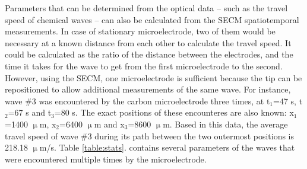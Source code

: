 \documentclass[3p, twocolumn]{elsarticle}
\begin{document}
Parameters that can be determined from the optical data -- such as the travel speed of chemical waves -- can also be calculated from the SECM spatiotemporal measurements.
In case of stationary microelectrode, two of them would be necessary at a known distance from each other to calculate the travel speed.
It could be calculated as the ratio of the distance between the electrodes, and the time it takes for the wave to get from the first microelectrode to the second.
However, using the SECM, one microelectrode is sufficient because the tip can be repositioned to allow additional measurements of the same wave.
For instance, wave \#3 was encountered by the carbon microelectrode three times, at t$_1$=47 s, t$_2$=67 s and t$_3$=80 s.
The exact positions of these encounteres are also known: x$_1$=1400 $\upmu$m, x$_2$=6400 $\upmu$m and x$_3$=8600 $\upmu$m.
Based in this data, the average travel speed of wave \#3 during its path between the two outermost positions is 218.18 $\upmu$m/s.
Table \ref{table:stats}. contains several parameters of the waves that were encountered multiple times by the microelectrode. 
\end{document}
